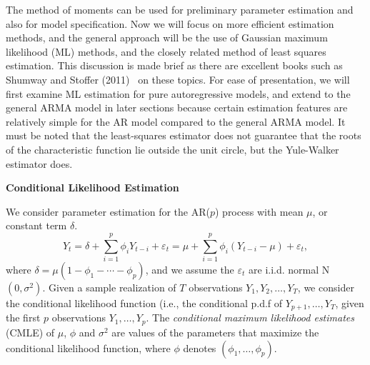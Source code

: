 The method of moments can be used for preliminary parameter estimation and also for model specification. Now we will focus on more efficient estimation methods, and the general approach will be the use of Gaussian maximum likelihood (ML) methods, and the closely related method of least squares estimation. This discussion is made brief as there are excellent books such as Shumway and Stoffer (2011)~\cite{shumway2011arima} on these topics. For ease of presentation, we will first examine ML estimation for pure autoregressive models, and extend to the general ARMA model in later sections because certain estimation features are relatively simple for the AR model compared to the general ARMA model. It must be noted that the least-squares estimator does not guarantee that the roots of the characteristic function lie outside the unit circle, but the Yule-Walker estimator does. \twomedskip


\noindent\textbf{Conditional Likelihood Estimation} \twomedskip


We consider parameter estimation for the AR($p$) process with mean $\mu$, or constant term $\delta$.
	\begin{equation} \label{eqn:ytseqagain}
	Y_t = \delta + \sum_{i=1}^p \phi_i Y_{t-i} + \varepsilon_t= \mu + \sum_{i=1}^p \phi_i (Y_{t-i} - \mu) + \varepsilon_t,
	\end{equation}
where $\delta = \mu(1 - \phi_1 - \cdots - \phi_p)$, and we assume the $\varepsilon_t$ are i.i.d. normal N$(0, \sigma^2)$. Given a sample realization of $T$ observations $Y_1, Y_2, \ldots, Y_T$, we consider the conditional likelihood function (i.e., the conditional p.d.f of $Y_{p+1}, \ldots, Y_T$, given the first $p$ observations $Y_1, \ldots, Y_p$. The \emph{conditional maximum likelihood estimates} (CMLE) of $\mu$, $\phi$ and $\sigma^2$ are values of the parameters that maximize the conditional likelihood function, where $\phi$ denotes $(\phi_1,\ldots,\phi_p)$.


